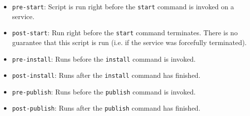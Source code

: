 \begin{itemize}

\item \verb!pre-start!: Script is run right before the \verb!start! command is
    invoked on a service.

\item \verb!post-start!: Run right before the \verb!start! command
    terminates. There is no guarantee that this script is run (i.e. if the
    service was forcefully terminated).

\item \verb!pre-install!: Runs before the \verb!install! command is invoked.

\item \verb!post-install!: Runs after the \verb!install! command has finished.

\item \verb!pre-publish!: Runs before the \verb!publish! command is invoked.

\item \verb!post-publish!: Runs after the \verb!publish! command has finished.

\end{itemize}
